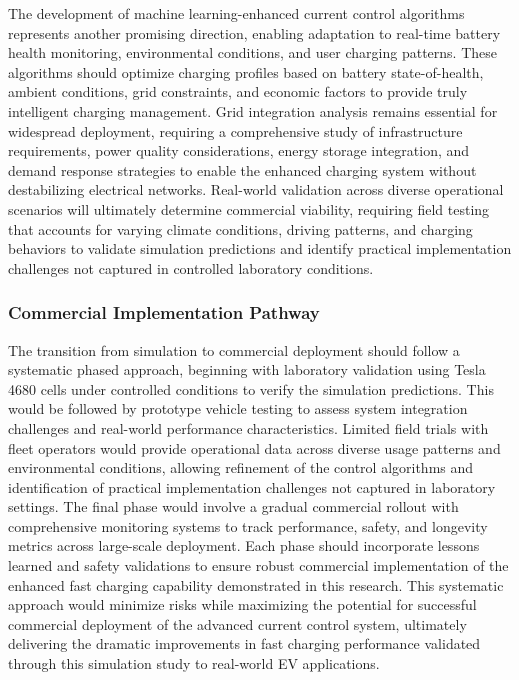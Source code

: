\documentclass[conference]{IEEEtran}
\begin{document}
The development of machine learning-enhanced current control algorithms represents another promising direction, enabling adaptation to real-time battery health monitoring, environmental conditions, and user charging patterns. These algorithms should optimize charging profiles based on battery state-of-health, ambient conditions, grid constraints, and economic factors to provide truly intelligent charging management. Grid integration analysis remains essential for widespread deployment, requiring a comprehensive study of infrastructure requirements, power quality considerations, energy storage integration, and demand response strategies to enable the enhanced charging system without destabilizing electrical networks.
Real-world validation across diverse operational scenarios will ultimately determine commercial viability, requiring field testing that accounts for varying climate conditions, driving patterns, and charging behaviors to validate simulation predictions and identify practical implementation challenges not captured in controlled laboratory conditions.

\subsubsection{ Commercial Implementation Pathway}

The transition from simulation to commercial deployment should follow a systematic phased approach, beginning with laboratory validation using Tesla 4680 cells under controlled conditions to verify the simulation predictions. This would be followed by prototype vehicle testing to assess system integration challenges and real-world performance characteristics. Limited field trials with fleet operators would provide operational data across diverse usage patterns and environmental conditions, allowing refinement of the control algorithms and identification of practical implementation challenges not captured in laboratory settings.
The final phase would involve a gradual commercial rollout with comprehensive monitoring systems to track performance, safety, and longevity metrics across large-scale deployment. Each phase should incorporate lessons learned and safety validations to ensure robust commercial implementation of the enhanced fast charging capability demonstrated in this research. This systematic approach would minimize risks while maximizing the potential for successful commercial deployment of the advanced current control system, ultimately delivering the dramatic improvements in fast charging performance validated through this simulation study to real-world EV applications.
\end{document}
